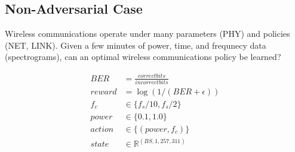 \documentclass[a0,portrait]{a0poster}
\begin{document}
\begin{multicols}{2} %

\section{Non-Adversarial Case}
\large

Wireless communications operate under many parameters (PHY) and policies (NET, LINK). Given a few minutes of power, time, and frequnecy data (spectrograms), can an optimal wireless communications policy be learned?


\begin{center}
\end{center}




\begin{align}
BER &= \frac{correct bits}{incorrect bits}
\\
reward &= \log (1 / (BER + \epsilon) )
\\
f_c &\in \{ f_s/10 ,f_s/2  \}
\\
power &\in \{ 0.1, 1.0 \}
\\
action & \in \{ (power, f_c)  \}
\\
state & \in \mathbb{R}^{(BS, 1, 257, 311)}
\end{align}

\vspace{5cm}

\begin{center}
\end{center}


\end{multicols}
\end{document}
